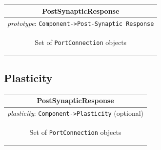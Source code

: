 \documentclass[draftspec]{ninemlspec}
\begin{document}
\begin{table}[htb]
\center
\begin{tabular}{|c|}
\hline
\hline
PostSynapticResponse \\
\hline
\hline
{\em prototype}: {\tt Component->Post-Synaptic Response} \\
\hline
\colorbox{issuecolor}{\parbox{0.4\linewidth}
{\center Set of {\tt PortConnection} objects}} \\
\hline
\end{tabular}
\end{table}


\subsection{Plasticity}
\label{plasticity}

\begin{table}[htb]
\center
\begin{tabular}{|c|}
\hline
\hline
PostSynapticResponse \\
\hline
\hline
{\em plasticity}: {\tt Component->Plasticity} (optional) \\
\hline
\colorbox{issuecolor}{\parbox{0.4\linewidth}
{\center Set of {\tt PortConnection} objects}} \\
\hline
\end{tabular}
\end{table}
\end{document}
